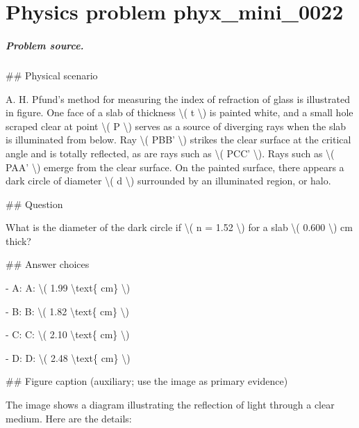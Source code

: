 
\chapter{Physics problem phyx\_mini\_0022}
\label{ch:PhyXMiniProblems_problem_phyx_mini_0022}

\paragraph{Problem source.}
\#\# Physical scenario

A. H. Pfund's method for measuring the index of refraction of glass is illustrated in figure. One face of a slab of thickness \textbackslash{}( t \textbackslash{}) is painted white, and a small hole scraped clear at point \textbackslash{}( P \textbackslash{}) serves as a source of diverging rays when the slab is illuminated from below. Ray \textbackslash{}( PBB' \textbackslash{}) strikes the clear surface at the critical angle and is totally reflected, as are rays such as \textbackslash{}( PCC' \textbackslash{}). Rays such as \textbackslash{}( PAA' \textbackslash{}) emerge from the clear surface. On the painted surface, there appears a dark circle of diameter \textbackslash{}( d \textbackslash{}) surrounded by an illuminated region, or halo.

\#\# Question

What is the diameter of the dark circle if \textbackslash{}( n = 1.52 \textbackslash{}) for a slab \textbackslash{}( 0.600 \textbackslash{}) cm thick?

\#\# Answer choices

- A: A: \textbackslash{}( 1.99 \textbackslash{}text\{ cm\} \textbackslash{})

- B: B: \textbackslash{}( 1.82 \textbackslash{}text\{ cm\} \textbackslash{})

- C: C: \textbackslash{}( 2.10 \textbackslash{}text\{ cm\} \textbackslash{})

- D: D: \textbackslash{}( 2.48 \textbackslash{}text\{ cm\} \textbackslash{})

\#\# Figure caption (auxiliary; use the image as primary evidence)

The image shows a diagram illustrating the reflection of light through a clear medium. Here are the details:

